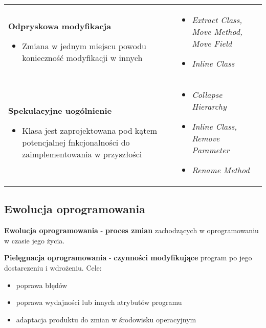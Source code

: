 \documentclass[../main.tex]{subfiles}
\begin{document}
\begin{table}[H]
\begin{center}
\begin{tabular}{ p{.35\linewidth} p{.65\linewidth}}
                \cmidrule(r){1-1}\cmidrule(l){2-2}
                \textbf{Odpryskowa modyfikacja}
                \begin{itemize}
                    \item Zmiana w jednym miejscu powodu konieczność modyfikacji w innych
                \end{itemize}
                &
                \begin{itemize}
                    \item \textit{Extract Class, Move Method, Move Field}
                    \item \textit{Inline Class}
                \end{itemize}
                \\

                \cmidrule(r){1-1}\cmidrule(l){2-2}
                \textbf{Spekulacyjne uogólnienie}
                \begin{itemize}
                    \item Klasa jest zaprojektowana pod kątem potencjalnej fnkcjonalności do zaimplementowania w przyszłości
                \end{itemize}
                &
                \begin{itemize}
                    \item \textit{Collapse Hierarchy}
                    \item \textit{Inline Class, Remove Parameter}
                    \item \textit{Rename Method}
                \end{itemize}
                \\
            \end{tabular}
        \end{center}
    \end{table}

    \subsection{Ewolucja oprogramowania}
    \textbf{Ewolucja oprogramowania} - \textbf{proces zmian} zachodzących w oprogramowaniu
    w czasie jego życia.

    \textbf{Pielęgnacja oprogramowania} - \textbf{czynności modyfikujące} program
    po jego dostarczeniu i wdrożeniu. Cele:
    \begin{itemize}
        \item poprawa błędów
        \item poprawa wydajności lub innych atrybutów programu
        \item adaptacja produktu do zmian w środowisku operacyjnym
    \end{itemize}
\end{document}
